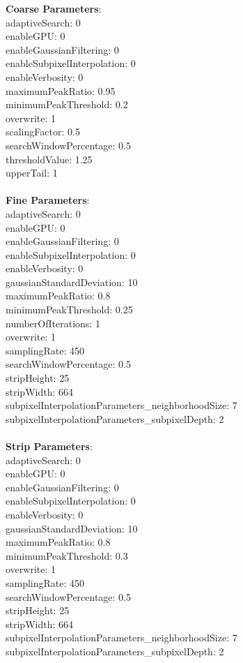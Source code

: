 \documentclass[11pt]{article}
\begin{document}
\textbf{Coarse Parameters}: \\
adaptiveSearch: 0\\
enableGPU: 0\\
enableGaussianFiltering: 0\\
enableSubpixelInterpolation: 0\\
enableVerbosity: 0\\
maximumPeakRatio: 0.95\\
minimumPeakThreshold: 0.2\\
overwrite: 1\\
scalingFactor: 0.5\\
searchWindowPercentage: 0.5\\
thresholdValue: 1.25\\
upperTail: 1\\
\\
\textbf{Fine Parameters}: \\
adaptiveSearch: 0\\
enableGPU: 0\\
enableGaussianFiltering: 0\\
enableSubpixelInterpolation: 0\\
enableVerbosity: 0\\
gaussianStandardDeviation: 10\\
maximumPeakRatio: 0.8\\
minimumPeakThreshold: 0.25\\
numberOfIterations: 1\\
overwrite: 1\\
samplingRate: 450\\
searchWindowPercentage: 0.5\\
stripHeight: 25\\
stripWidth: 664\\
subpixelInterpolationParameters\_neighborhoodSize: 7\\
subpixelInterpolationParameters\_subpixelDepth: 2\\
\\
\textbf{Strip Parameters}: \\
adaptiveSearch: 0\\
enableGPU: 0\\
enableGaussianFiltering: 0\\
enableSubpixelInterpolation: 0\\
enableVerbosity: 0\\
gaussianStandardDeviation: 10\\
maximumPeakRatio: 0.8\\
minimumPeakThreshold: 0.3\\
overwrite: 1\\
samplingRate: 450\\
searchWindowPercentage: 0.5\\
stripHeight: 25\\
stripWidth: 664\\
subpixelInterpolationParameters\_neighborhoodSize: 7\\
subpixelInterpolationParameters\_subpixelDepth: 2\\
\\
\newpage
\end{document}
